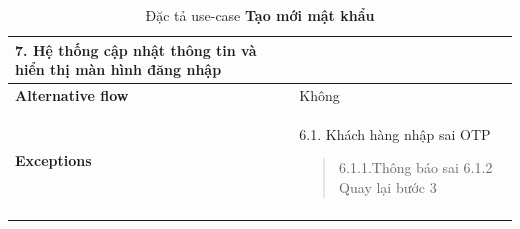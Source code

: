\begin{longtable}{| p{} | p{} |}
                    7. Hệ thống cập nhật thông tin và hiển thị màn hình đăng nhập
                \\
                \hline
                    \textbf{Alternative flow}
                &
                    Không
                \\
                \hline
                    \textbf{Exceptions} 
                &
                6.1.  Khách hàng nhập sai OTP
                    \begin{quote} 
                    6.1.1.Thông báo sai
                        6.1.2 Quay lại bước 3
                    \end{quote}
                \\
                \hline
                \caption{Đặc tả use-case \textbf{Tạo mới mật khẩu}}
            \end{longtable}
        
